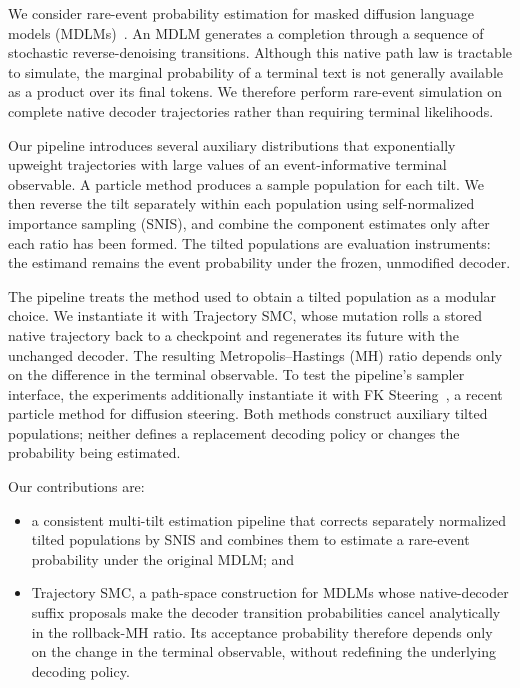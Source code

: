 \documentclass{article}
\begin{document}
We consider rare-event probability estimation for masked diffusion language
models (MDLMs)~\citep{sahoo2024mdlm}. An MDLM generates a completion through a
sequence of stochastic reverse-denoising transitions. Although this native
path law is tractable to simulate, the marginal probability of a terminal text
is not generally available as a product over its final tokens. We therefore
perform rare-event simulation on complete native decoder trajectories rather
than requiring terminal likelihoods.

Our pipeline introduces several auxiliary distributions that exponentially
upweight trajectories with large values of an event-informative terminal
observable. A particle method produces
a sample population for each tilt. We then reverse the tilt separately
within each population using self-normalized importance sampling (SNIS), and
combine the component estimates only after each ratio has been formed. The
tilted populations are evaluation instruments: the estimand remains the event
probability under the frozen, unmodified decoder.

The pipeline treats the method used to obtain a tilted population as a modular
choice. We instantiate it with Trajectory SMC, whose
mutation rolls a stored native trajectory back to a checkpoint and regenerates
its future with the unchanged decoder. The resulting Metropolis--Hastings (MH)
ratio depends only on the difference in the terminal observable. To test the
pipeline's sampler interface, the experiments additionally instantiate it with
FK Steering~\citep{singhal2025fk}, a recent particle method for diffusion
steering. Both methods construct auxiliary tilted populations; neither defines
a replacement decoding policy or changes the probability being estimated.

Our contributions are:
\begin{itemize}[leftmargin=*,itemsep=2pt,topsep=3pt]
    \item a consistent multi-tilt estimation pipeline that corrects separately
    normalized tilted populations by SNIS and combines them to estimate a
    rare-event probability under the original MDLM; and
    \item Trajectory SMC, a path-space construction for MDLMs whose
    native-decoder suffix proposals make the decoder transition probabilities
    cancel analytically in the rollback-MH ratio. Its acceptance probability
    therefore depends only on the change in the terminal observable, without
    redefining the underlying decoding policy.
\end{itemize}
\end{document}
